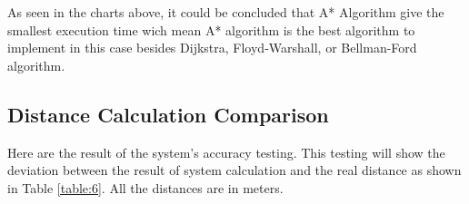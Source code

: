 \vspace{10mm}
As seen in the charts above, it could be concluded that A* Algorithm give the smallest execution time wich mean A* algorithm is the best algorithm to implement in this case besides Dijkstra, Floyd-Warshall, or Bellman-Ford algorithm. 
\vspace{60mm}
\subsection{Distance Calculation Comparison}
Here are the result of the system's accuracy testing. This testing will show the deviation between the result of system calculation and the real distance as shown in Table \ref{table:6}. All the distances are in meters.

